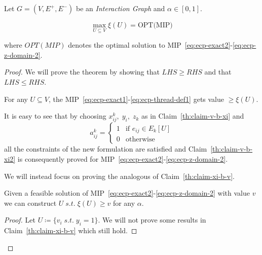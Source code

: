 \begin{theorem}
	\label{th:ecp-mip}
	Let $G = (V, E^{+}, E^{-})$ be an \emph{Interaction Graph} and $\alpha \in
		[0, 1]$.

	\begin{equation}
		\max_{U \subseteq V} \xi(U) = \text{OPT(MIP)}
	\end{equation}

	where $OPT(MIP)$ denotes the optimal solution to
	MIP~\eqref{eq:ecp-exact2}-\eqref{eq:ecp-z-domain-2}.
\end{theorem}
\begin{proof}
	We will prove the theorem by showing that $LHS \geq RHS$ and that $LHS \leq
		RHS$.
	\begin{claim}
		\label{th:claim-v-b-xi2}
		For any $U \subseteq V$, the
		MIP~\eqref{eq:ecp-exact1}-\eqref{eq:ecp-thread-def1} gets value $\geq \xi(U)$.
	\end{claim}

	It is easy to see that by choosing $x_{ij}^{k}, \; y_i, \; z_k$ as in
	Claim~\ref{th:claim-v-b-xi} and
	\begin{equation*}
		a_{ij}^{k} = \begin{cases}
			1 & \text{if } e_{ij} \in E_k[U] \\
			0 & \text{otherwise}
		\end{cases}
	\end{equation*}
	all the constraints of the new formulation are satisfied and
	Claim~\ref{th:claim-v-b-xi2} is consequently proved for
	MIP~\eqref{eq:ecp-exact2}-\eqref{eq:ecp-z-domain-2}.

	We will instead focus on proving the analogous of Claim~\ref{th:claim-xi-b-v}.
	\begin{claim}
		\label{th:claim-xi-b-v2}
		Given a feasible solution of
		MIP~\eqref{eq:ecp-exact2}-\eqref{eq:ecp-z-domain-2} with value $v$ we can
		construct $U \; s.t. \; \xi(U) \geq v$ for any $\alpha$.
	\end{claim}

	\begin{proof}
		Let $U \coloneqq \{ v_i \; s.t. \; y_i = 1\} $. We will not prove
		some results in Claim~\ref{th:claim-xi-b-v} which still hold.


\end{proof}
\end{proof}
